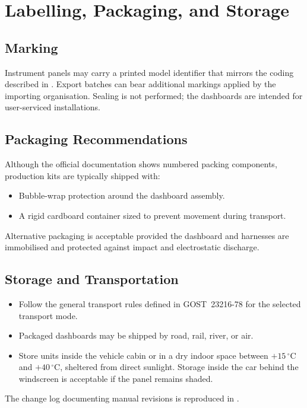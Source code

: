 \chapter{Labelling, Packaging, and Storage} \label{ch:Summary}

\section{Marking}

Instrument panels may carry a printed model identifier that mirrors the coding described in .
Export batches can bear additional markings applied by the importing organisation.
Sealing is not performed; the dashboards are intended for user-serviced installations.

\section{Packaging Recommendations}

Although the official documentation shows numbered packing components, production kits are typically shipped with:
\begin{itemize}
    \item Bubble-wrap protection around the dashboard assembly.
    \item A rigid cardboard container sized to prevent movement during transport.
\end{itemize}
Alternative packaging is acceptable provided the dashboard and harnesses are immobilised and protected against impact and electrostatic discharge.

\section{Storage and Transportation}

\begin{itemize}
    \item Follow the general transport rules defined in GOST~23216-78 for the selected transport mode.
    \item Packaged dashboards may be shipped by road, rail, river, or air.
    \item Store units inside the vehicle cabin or in a dry indoor space between \(+15\,^{\circ}\mathrm{C}\) and \(+40\,^{\circ}\mathrm{C}\), sheltered from direct sunlight. Storage inside the car behind the windscreen is acceptable if the panel remains shaded.
\end{itemize}

The change log documenting manual revisions is reproduced in .
